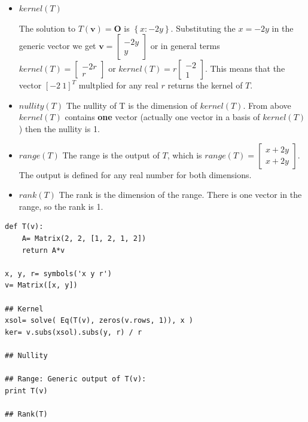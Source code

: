 \begin{itemize}
\item $kernel(T)$

The solution to $T(\mathbf{v})=\mathbf{O}$ is $\left \{ x : - 2 y\right \}$.
Substituting the $x= -2y$ in the generic vector we get
$\mathbf{v} = \left[\begin{matrix}- 2 y\\y\end{matrix}\right]$ or in general terms
$kernel(T) = \left[\begin{matrix}- 2 r\\r\end{matrix}\right]$ or
$kernel(T) = r \left[\begin{matrix}- 2 \\1\end{matrix}\right]$. This means that
the vector $[-2\ 1]^T$ multplied for any real $r$ returns the kernel of $T$.

\item $nullity(T)$
The nullity of T is the dimension of $kernel(T)$. From above $kernel(T)$ contains
\textbf{one} vector (actually one vector in a basis of $kernel(T)$) then the nullity
is 1.

\item $range(T)$
The range is the output of $T$, which is $range(T) = \left[\begin{matrix}x + 2 y\\x + 2 y\end{matrix}\right]$.
The output is defined for any real number for both dimensions.

\item $rank(T)$
The rank is the dimension of the range. There is one vector in the range, so the rank
is 1.
\end{itemize}


\begin{verbatim}
def T(v):
    A= Matrix(2, 2, [1, 2, 1, 2])
    return A*v

x, y, r= symbols('x y r')
v= Matrix([x, y])

## Kernel
xsol= solve( Eq(T(v), zeros(v.rows, 1)), x )
ker= v.subs(xsol).subs(y, r) / r

## Nullity

## Range: Generic output of T(v):
print T(v)

## Rank(T)
\end{verbatim}